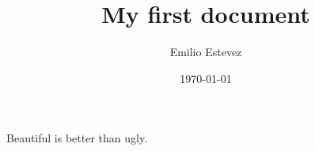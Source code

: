 \documentclass{article}
\title{My first document}
\author{Emilio Estevez}
\date{\today}
\begin{document}
\maketitle
Beautiful is better than ugly.
\end{document}
